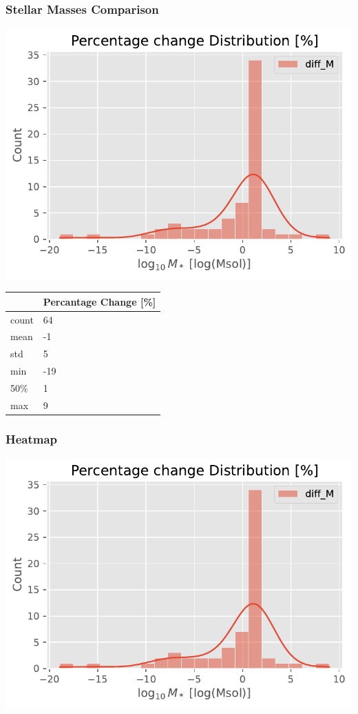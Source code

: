 \documentclass[
]{article}
\begin{document}
\subsubsection{Stellar Masses Comparison}

\includegraphics{compare_files/figure-pdf/cell-44-output-1.pdf}

\begin{longtable}[]{@{}ll@{}}
\toprule\noalign{}
& Percantage Change {[}\%{]} \\
\midrule\noalign{}
\endhead
\bottomrule\noalign{}
\endlastfoot
count & 64 \\
mean & -1 \\
std & 5 \\
min & -19 \\
50\% & 1 \\
max & 9 \\
\end{longtable}

\subsubsection{Heatmap}

\includegraphics{compare_files/figure-pdf/cell-47-output-1.pdf}
\end{document}
